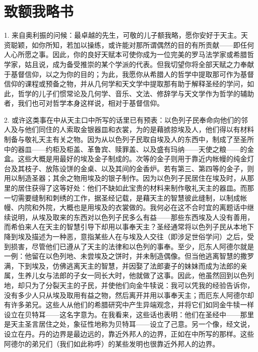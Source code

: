 
\chapter{致额我略书}


1. 来自奥利振的问候：最卓越的先生，可敬的儿子额我略，愿你安好于天主。天资聪颖，如你所知，若加以操练，或许能对那所谓偶然的目的有所贡献——即任何人心所愿之事。因此，你的良好天赋本可使你成为一位完美的罗马法学家或希腊哲学家，姑且说，成为备受推崇的某个学派的代表。但我切望你将全部天赋之力奉献于基督信仰，以之为你的目的；为此，我愿你从希腊人的哲学中提取那可作为基督信仰的课程或预备之物，并从几何学和天文学中提取那有助于解释圣经的学问，如此，哲学的儿子们惯常论及几何学、音乐、文法、修辞学与天文学作为哲学的辅助者，我们也可对哲学本身这样说，相对于基督信仰。\par

2. 或许这类事在中从天主口中所写的话里已有预表：以色列子民奉命向他们的邻人及与他们同住的人索取金银器皿和衣裳，为的是藉掳掠埃及人，他们得以有材料制备与敬礼天主有关之物。因为从以色列子民取自埃及人的东西中，制成了至圣所中的器皿——约柜及柜盖、革鲁宾、赎罪盖、以及盛有玛纳——天使之粮——的金盒。这些大概是用最好的埃及金子制成的。次等的金子则用于靠近内帐幔的纯金灯台及其枝子、放陈设饼的金桌、以及其间的金香炉。若有第三、第四等的金子，则用以制造圣器；其余之物用埃及的银子制作。因为以色列子民居住在埃及时，从那里的居住获得了这等好处：他们不缺如此宝贵的材料来制作敬礼天主的器皿。而那一切需要缝制和刺绣的工作，据圣经记载，是藉天主的智慧彼此缝制，以制成帐幔、内院和外院，大概也是用埃及的衣裳做的。我何必在这不合时宜的离题话中继续说明，从埃及取来的东西对以色列子民多么有益——那些东西埃及人没有善用，而希伯来人在天主的智慧引导下却用以事奉天主？圣经通常将以色列子民从本地下降到埃及描述为一种恶，意指某些人在与埃及人交往（即涉足世俗学问）之后，受到损害，尽管他们已遵从了天主的法律和以色列的事奉。至少，厄东人阿德尔就是一例：他留在以色列地、未尝埃及之饼时，并未制造偶像。但当他逃离智慧的撒罗满，下到埃及，仿佛逃离天主的智慧，并因娶了法郎妻子的妹妹而成为法郎的亲属，生养儿女与法郎的子女一同长大时，他就做了这事。因此，他虽然回到以色列地，却只为了分裂天主的子民，并使他们向金牛犊说：我可以凭我的经验告诉你，没有多少人只从埃及取用有益之物，然后离开并用以事奉天主；而厄东人阿德尔却有许多弟兄。这些人从他们的希腊研究中产生异端观念，并将它们如同金牛犊一样设立在贝特耳——这名字意为。在我看来，这些话也表明：他们在圣经中——那里是天主圣言居住之处，象征性地称为贝特耳——设立了己意。另一个像，经文说，设立在丹。丹的边界是最边远的，靠近外邦人的边界，正如在中所写的那样。这些阿德尔的弟兄们（我们如此称呼）的某些发明也很靠近外邦人的边界。\par

